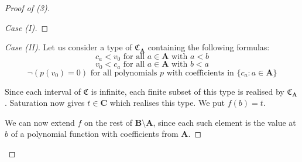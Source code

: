 \documentclass[titlepage, oneside]{amsbook}
\theoremstyle{plain}
\theoremstyle{definition}
\theoremstyle{remark}
\newcommand{\mc}{\ensuremath{\mathfrak{C}}}
\newcommand{\ba}{\ensuremath{\mathbf{A}}}
\newcommand{\bb}{\ensuremath{\mathbf{B}}}
\newcommand{\bc}{\ensuremath{\mathbf{C}}}
\begin{document}
\begin{proof}[Proof of (3)]
\begin{proof}[Case (I)]
\renewcommand{\qedsymbol}{}
\end{proof}


\begin{proof}[Case (II)] Let us consider a type of $\mc_\ba $ containing 
the following formulas: 
\[ c_a < v_0 \mbox{ for all } a \in \ba \mbox{ with } a < b \]
\[v_0 < c_a \mbox{ for all } a \in \ba \mbox{ with }b < a \]
\[ \neg (p ( v_0 ) = 0) \mbox{ for all polynomials } p \mbox{ with 
coefficients in  } \{c_a : a \in \ba\} \]

Since each interval of $\mc$ is infinite, each finite subset of this type 
is realised by $\mc_ \ba $.
Saturation now gives $t \in \bc$ which realises this type. We put $f(b)
= t $. 

We can now extend $f$ on the rest of $\bb \setminus \ba$, since 
each such element is the value at $b$ of a polynomial function  with
coefficients from 
$\ba$.
\renewcommand{\qedsymbol}{}
\end{proof}
\end{proof}







\nocite{*}

\printindex
\end{document}
